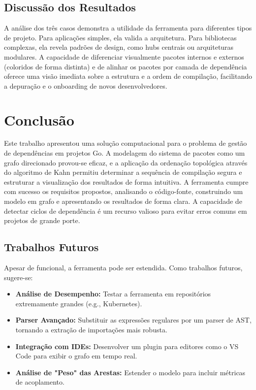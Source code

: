 \documentclass[12pt]{article}
\begin{document}
\subsection{Discussão dos Resultados}
A análise dos três casos demonstra a utilidade da ferramenta para diferentes tipos de projeto. Para aplicações simples, ela valida a arquitetura. Para bibliotecas complexas, ela revela padrões de design, como hubs centrais ou arquiteturas modulares. A capacidade de diferenciar visualmente pacotes internos e externos (coloridos de forma distinta) e de alinhar os pacotes por camada de dependência oferece uma visão imediata sobre a estrutura e a ordem de compilação, facilitando a depuração e o onboarding de novos desenvolvedores.

\section{Conclusão}
Este trabalho apresentou uma solução computacional para o problema de gestão de dependências em projetos Go. A modelagem do sistema de pacotes como um grafo direcionado provou-se eficaz, e a aplicação da ordenação topológica através do algoritmo de Kahn \cite{kahn1962} permitiu determinar a sequência de compilação segura e estruturar a visualização dos resultados de forma intuitiva. A ferramenta cumpre com sucesso os requisitos propostos, analisando o código-fonte, construindo um modelo em grafo e apresentando os resultados de forma clara. A capacidade de detectar ciclos de dependência é um recurso valioso para evitar erros comuns em projetos de grande porte.

\subsection{Trabalhos Futuros}
Apesar de funcional, a ferramenta pode ser estendida. Como trabalhos futuros, sugere-se:
\begin{itemize}
    \item \textbf{Análise de Desempenho:} Testar a ferramenta em repositórios extremamente grandes (e.g., Kubernetes).
    \item \textbf{Parser Avançado:} Substituir as expressões regulares por um parser de AST, tornando a extração de importações mais robusta.
    \item \textbf{Integração com IDEs:} Desenvolver um plugin para editores como o VS Code para exibir o grafo em tempo real.
    \item \textbf{Análise de "Peso" das Arestas:} Estender o modelo para incluir métricas de acoplamento.
\end{itemize}



\end{document}
